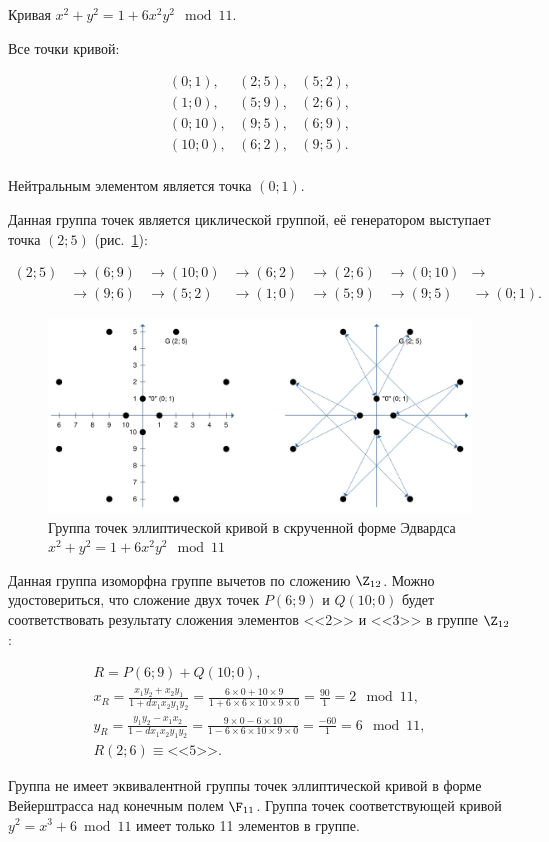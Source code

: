 Кривая $x^2+y^2=1+6x^2y^2 \mod 11$.

Все точки кривой:

\[ \begin{array}{lll}
(0; 1), & (2; 5), & (5; 2), \\
(1; 0), & (5; 9), & (2; 6), \\
(0; 10), & (9; 5), & (6; 9), \\
(10; 0), & (6; 2), & (9; 5). \\
\end{array} \]

Нейтральным элементом является точка $(0; 1)$. 

Данная группа точек является циклической группой, её генератором выступает точка $(2; 5)$ (рис.~\ref{pic:Twisted-Edwards-Curve-Example}):

\[ \begin{array}{lllllll}
(2; 5) & \to (6; 9) & \to (10; 0) & \to (6; 2) & \to (2; 6) & \to (0; 10) & \to \\
       & \to (9; 6) & \to (5; 2)  & \to (1; 0) & \to (5; 9) & \to (9; 5)  & \to (0; 1).
\end{array} \]

\begin{figure}
	\centering
	\includegraphics[width=1\textwidth]{pic/Twisted-Edwards-Curve-Example}
	\caption{Группа точек эллиптической кривой в скрученной форме Эдвардса $x^2+y^2=1+6x^2y^2 \mod 11$}
	\label{pic:Twisted-Edwards-Curve-Example}
\end{figure}

Данная группа изоморфна группе вычетов по сложению $\Z_{12}$. Можно удостовериться, что сложение двух точек $P (6; 9)$ и $Q(10; 0)$ будет соответствовать результату сложения элементов <<2>> и <<3>> в группе $\Z_{12}$:

\[ \begin{array}{l}
	R = P (6; 9) + Q (10; 0), \\
	x_R = \frac{x_1 y_2 + x_2 y_1}{1 + d x_1 x_2 y_1 y_2} = \frac{6 \times 0 + 10 \times 9}{1 + 6 \times 6 \times 10 \times 9 \times 0} = \frac{90}{1} = 2 \mod 11, \\
	y_R = \frac{y_1 y_2 - x_1 x_2}{1 - d x_1 x_2 y_1 y_2} = \frac{9 \times 0 - 6 \times 10}{1 - 6 \times 6 \times 10 \times 9 \times 0} = \frac{-60}{1} = 6 \mod 11, \\
	R (2; 6) \equiv \text{<<5>>}.
\end{array} \]

Группа не имеет эквивалентной группы точек эллиптической кривой в форме Вейерштрасса над конечным полем $\F_{11}$. Группа точек соответствующей кривой $y^2 = x^3 + 6 \bmod 11$ имеет только 11 элементов в группе.

